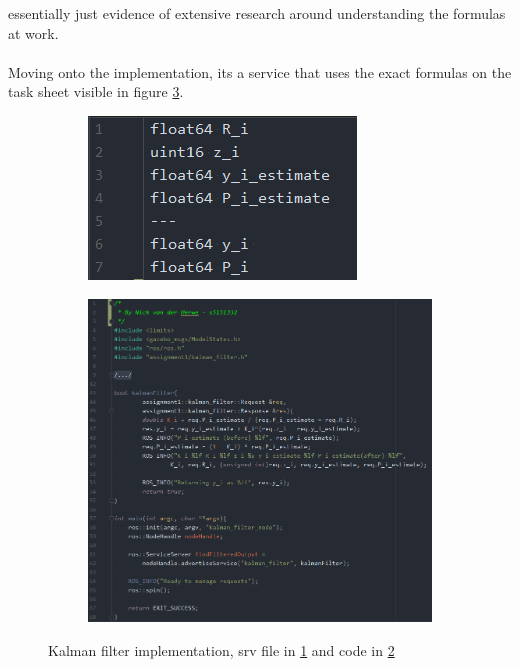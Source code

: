 \documentclass{article}
\begin{document}
essentially just evidence of extensive research around understanding the formulas
at work.
\\ \\
Moving onto the implementation, its a service that uses the exact formulas on
the task sheet visible in figure \ref{kalmanImplement}.
\begin{figure}[ht]
    \begin{subfigure}{.5\textwidth}
        \centering
        \includegraphics[scale=0.4]{img/kalman_filter_srv.png}
        \caption{}
        \label{kalmanSrv}
    \end{subfigure}
    \begin{subfigure}{.5\textwidth}
        \centering
        \includegraphics[scale=0.35]{img/kalman_filter.png}
        \caption{}
        \label{kalmanCode}
    \end{subfigure}
    \caption{Kalman filter implementation, srv file in \ref{kalmanSrv} and code
    in \ref{kalmanCode}}
    \label{kalmanImplement}
\end{figure}
\end{document}
